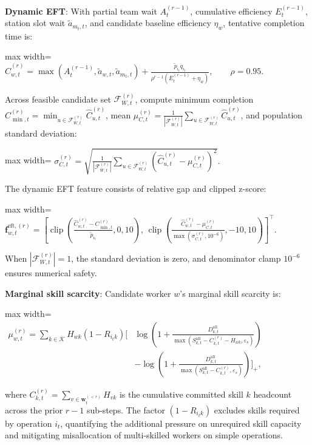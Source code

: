 \documentclass[journal,10pt]{IEEEtran}
\begin{document}
\textbf{Dynamic EFT}:
With partial team wait $A_t^{(r-1)}$, cumulative efficiency $E_t^{(r-1)}$, station slot wait $\widetilde a_{m_t,t}$, and candidate baseline efficiency $\eta_w$, tentative completion time is:
\begin{center}
\begin{adjustbox}{max width=\columnwidth}
$\displaystyle
\widehat C_{w,t}^{(r)} = \max\!\left(A_t^{(r-1)}, \widetilde a_{w,t}, \widetilde a_{m_t,t}\right) + \frac{\widetilde p_{i_t}q_{i_t}}{\rho^{r-1}(E_t^{(r-1)}+\eta_w)}, \qquad \rho=0.95.
$
\end{adjustbox}
\end{center}
Across feasible candidate set $\mathcal F_{W,t}^{(r)}$, compute minimum completion $C_{\min,t}^{(r)}=\min_{u\in\mathcal F_{W,t}^{(r)}}\widehat C_{u,t}^{(r)}$, mean $\mu_{C,t}^{(r)}=\frac{1}{|\mathcal F_{W,t}^{(r)}|}\sum_{u\in\mathcal F_{W,t}^{(r)}}\widehat C_{u,t}^{(r)}$, and population standard deviation:
\begin{center}
\begin{adjustbox}{max width=\columnwidth}
$\displaystyle
\sigma_{C,t}^{(r)} = \sqrt{\frac{1}{|\mathcal F_{W,t}^{(r)}|} \sum_{u\in\mathcal F_{W,t}^{(r)}} \left(\widehat C_{u,t}^{(r)}-\mu_{C,t}^{(r)}\right)^2}.
$
\end{adjustbox}
\end{center}
The dynamic EFT feature consists of relative gap and clipped z-score:
\begin{center}
\begin{adjustbox}{max width=\columnwidth}
$\displaystyle
\mathbf f_{w,t}^{\mathrm{eft},(r)} = \left[ \operatorname{clip}\left(\frac{\widehat C_{w,t}^{(r)}-C_{\min,t}^{(r)}}{\widetilde p_{i_t}}, 0, 10\right),\, \operatorname{clip}\left(\frac{\widehat C_{w,t}^{(r)}-\mu_{C,t}^{(r)}}{\max(\sigma_{C,t}^{(r)}, 10^{-6})}, -10, 10\right) \right]^\top.
$
\end{adjustbox}
\end{center}
When $|\mathcal F_{W,t}^{(r)}|=1$, the standard deviation is zero, and denominator clamp $10^{-6}$ ensures numerical safety.

\textbf{Marginal skill scarcity}:
Candidate worker $w$'s marginal skill scarcity is:
\begin{center}
\begin{adjustbox}{max width=\columnwidth}
$\displaystyle
\begin{aligned}
\mu_{w,t}^{(r)} = \sum_{k\in\mathcal K} H_{wk}(1-R_{i_tk}) \Bigg[
&\log\!\left(1 + \frac{D_{k,t}^{\mathrm{all}}}{\max(S_{k,t}^{\mathrm{all}}-C_{k,t}^{(r)}-H_{wk},\varepsilon_s)}\right) \\
&- \log\!\left(1 + \frac{D_{k,t}^{\mathrm{all}}}{\max(S_{k,t}^{\mathrm{all}}-C_{k,t}^{(r)},\varepsilon_s)}\right) \Bigg]_+,
\end{aligned}
$
\end{adjustbox}
\end{center}
where $C_{k,t}^{(r)} = \sum_{v\in\mathbf w_t^{(<r)}} H_{vk}$ is the cumulative committed skill $k$ headcount across the prior $r-1$ sub-steps. The factor $(1-R_{i_tk})$ excludes skills required by operation $i_t$, quantifying the additional pressure on unrequired skill capacity and mitigating misallocation of multi-skilled workers on simple operations.
\end{document}

